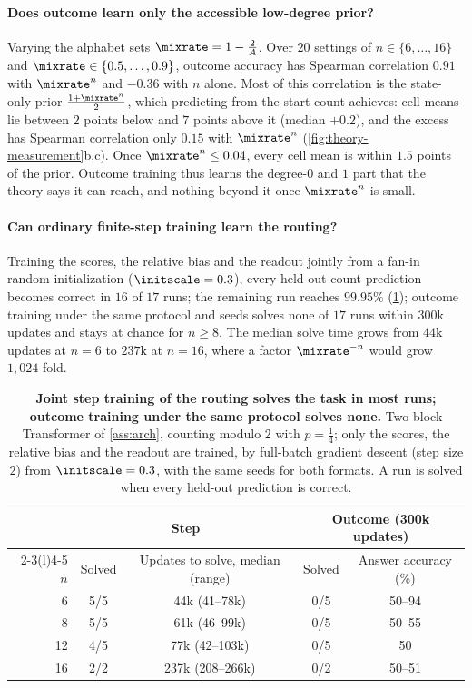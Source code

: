 \paragraph{Does outcome learn only the accessible low-degree prior?} Varying the alphabet sets $\mixrate=1-\frac{2}{A}$. Over $20$ settings
of $n\in\{6,\ldots,16\}$ and $\mixrate\in\{0.5,\ldots,0.9\}$, outcome accuracy has Spearman correlation $0.91$ with
$\mixrate^n$ and $-0.36$ with $n$ alone. Most of this correlation is the state-only prior $\frac{1+\mixrate^n}{2}$, which predicting
from the start count achieves: cell means lie between $2$ points below and $7$ points above it (median $+0.2$), and the excess
has Spearman correlation only $0.15$ with $\mixrate^n$ (\cref{fig:theory-measurement}b,c). Once $\mixrate^n\le0.04$, every
cell mean is within $1.5$ points of the prior. Outcome training thus learns the
degree-$0$ and $1$ part that the theory says it can reach, and nothing beyond it once $\mixrate^n$ is small.

\paragraph{Can ordinary finite-step training learn the routing?} Training the scores, the relative bias and the readout jointly from a fan-in
random initialization ($\initscale=0.3$), every held-out count prediction becomes correct in $16$ of $17$ runs; the
remaining run reaches $99.95\%$ (\cref{tab:reach}); outcome training under the same protocol and seeds solves none of $17$
runs within $300$k updates and stays at chance for $n\ge8$. The median solve time grows from $44$k updates at $n=6$ to $237$k at
$n=16$, where a factor $\mixrate^{-n}$ would grow $1{,}024$-fold.

\begin{table}[t]
\caption{\textbf{Joint step training of the routing solves the task in most runs; outcome training under the same protocol solves
none.} Two-block Transformer of \cref{ass:arch}, counting modulo $2$ with $p=\tfrac{1}{4}$; only the scores, the relative bias and the
readout are trained, by full-batch gradient descent (step size $2$) from $\initscale=0.3$, with the same seeds for both formats. A run is
solved when every held-out prediction is correct.}
\label{tab:reach}
\centering\small
\begin{tabular}{@{}rcccc@{}}
\toprule
 & \multicolumn{2}{c}{Step} & \multicolumn{2}{c}{Outcome (300k updates)}\\
\cmidrule(lr){2-3}\cmidrule(l){4-5}
$n$ & Solved & Updates to solve, median (range) & Solved & Answer accuracy (\%)\\
\midrule
6  & 5/5 & 44k (41--78k)   & 0/5 & 50--94\\
8  & 5/5 & 61k (46--99k)   & 0/5 & 50--55\\
12 & 4/5 & 77k (42--103k)  & 0/5 & 50\\
16 & 2/2 & 237k (208--266k) & 0/2 & 50--51\\
\bottomrule
\end{tabular}
\end{table}


